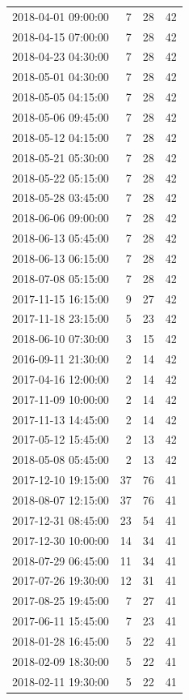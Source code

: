 \begin{tabular}{lrrr}
2018-04-01 09:00:00 & 7 & 28 & 42 \\
2018-04-15 07:00:00 & 7 & 28 & 42 \\
2018-04-23 04:30:00 & 7 & 28 & 42 \\
2018-05-01 04:30:00 & 7 & 28 & 42 \\
2018-05-05 04:15:00 & 7 & 28 & 42 \\
2018-05-06 09:45:00 & 7 & 28 & 42 \\
2018-05-12 04:15:00 & 7 & 28 & 42 \\
2018-05-21 05:30:00 & 7 & 28 & 42 \\
2018-05-22 05:15:00 & 7 & 28 & 42 \\
2018-05-28 03:45:00 & 7 & 28 & 42 \\
2018-06-06 09:00:00 & 7 & 28 & 42 \\
2018-06-13 05:45:00 & 7 & 28 & 42 \\
2018-06-13 06:15:00 & 7 & 28 & 42 \\
2018-07-08 05:15:00 & 7 & 28 & 42 \\
2017-11-15 16:15:00 & 9 & 27 & 42 \\
2017-11-18 23:15:00 & 5 & 23 & 42 \\
2018-06-10 07:30:00 & 3 & 15 & 42 \\
2016-09-11 21:30:00 & 2 & 14 & 42 \\
2017-04-16 12:00:00 & 2 & 14 & 42 \\
2017-11-09 10:00:00 & 2 & 14 & 42 \\
2017-11-13 14:45:00 & 2 & 14 & 42 \\
2017-05-12 15:45:00 & 2 & 13 & 42 \\
2018-05-08 05:45:00 & 2 & 13 & 42 \\
2017-12-10 19:15:00 & 37 & 76 & 41 \\
2018-08-07 12:15:00 & 37 & 76 & 41 \\
2017-12-31 08:45:00 & 23 & 54 & 41 \\
2017-12-30 10:00:00 & 14 & 34 & 41 \\
2018-07-29 06:45:00 & 11 & 34 & 41 \\
2017-07-26 19:30:00 & 12 & 31 & 41 \\
2017-08-25 19:45:00 & 7 & 27 & 41 \\
2017-06-11 15:45:00 & 7 & 23 & 41 \\
2018-01-28 16:45:00 & 5 & 22 & 41 \\
2018-02-09 18:30:00 & 5 & 22 & 41 \\
2018-02-11 19:30:00 & 5 & 22 & 41 \\

\end{tabular}
